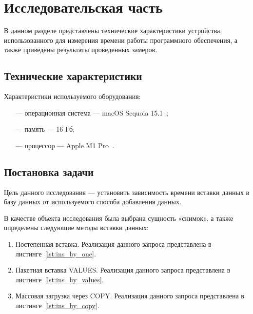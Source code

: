 \chapter{Исследовательская часть}

В данном разделе представлены технические характеристики устройства, использованного для измерения времени работы программного обеспечения, а также приведены результаты проведенных замеров.


\section{Технические характеристики}
Характеристики используемого оборудования:
\begin{itemize}
    \item[---] операционная система --- macOS Sequoia 15.1~\cite{macos-sequoia};
    \item[---] память --- 16 Гб;
    \item[---] процессор --- Apple M1 Pro~\cite{apple-silicon}.
\end{itemize}

\section{Постановка задачи}

Цель данного исследования --- установить зависимость времени вставки данных в базу данных от используемого способа добавления данных.

В качестве объекта исследования была выбрана сущность «снимок», а также определены следующие методы вставки данных:

\begin{enumerate}
    \item Постепенная вставка. Реализация данного запроса представлена в листинге~\ref{lst:ins_by_one}.
    \item Пакетная вставка VALUES. Реализация данного запроса представлена в листинге~\ref{lst:ins_by_values}.
    \item Массовая загрузка через COPY. Реализация данного запроса представлена в листинге~\ref{lst:ins_by_copy}.
\end{enumerate}

